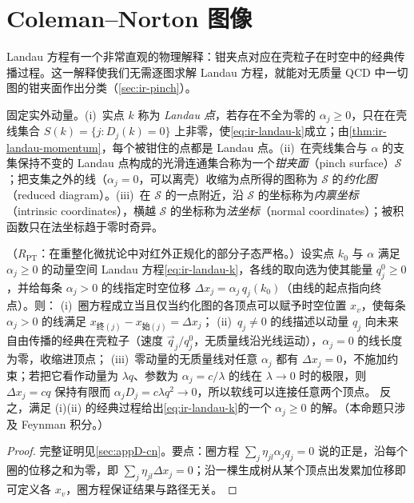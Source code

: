 \section{Coleman--Norton 图像}\label{sec:ir-coleman-norton}

Landau 方程有一个非常直观的物理解释：钳夹点对应在壳粒子在时空中的经典传播过程。这一解释使我们无需逐图求解 Landau 方程，就能对无质量 QCD 中一切图的钳夹面作出分类（\cref{sec:ir-pinch}）。

\begin{definition}\label{def:ir-pinch-surface}
固定实外动量。(i)~实点 $k$ 称为 \emph{Landau 点}，若存在不全为零的 $\alpha_j\ge0$，只在在壳线集合 $S(k)=\{j:D_j(k)=0\}$ 上非零，使\cref{eq:ir-landau-k}成立；由\cref{thm:ir-landau-momentum}，每个被钳住的点都是 Landau 点。(ii)~在壳线集合与 $\alpha$ 的支集保持不变的 Landau 点构成的光滑连通集合称为一个\emph{钳夹面}（pinch surface）$\mathcal S$；把支集之外的线（$\alpha_j=0$，可以离壳）收缩为点所得的图称为 $\mathcal S$ 的\emph{约化图}（reduced diagram）。(iii)~在 $\mathcal S$ 的一点附近，沿 $\mathcal S$ 的坐标称为\emph{内禀坐标}（intrinsic coordinates），横越 $\mathcal S$ 的坐标称为\emph{法坐标}（normal coordinates）；被积函数只在法坐标趋于零时奇异。
\end{definition}

\begin{proposition}\label{prop:ir-coleman-norton}
（$R_{\mathrm{PT}}$：在重整化微扰论中对红外正规化的部分子态严格。）设实点 $k_0$ 与 $\alpha$ 满足 $\alpha_j\ge0$ 的动量空间 Landau 方程\cref{eq:ir-landau-k}，各线的取向选为使其能量 $q_j^0\ge0$，并给每条 $\alpha_j>0$ 的线指定时空位移 $\Delta x_j=\alpha_j\,q_j(k_0)$（由线的起点指向终点）。则：
(i)~圈方程成立当且仅当约化图的各顶点可以赋予时空位置 $x_v$，使每条 $\alpha_j>0$ 的线满足 $x_{\text{终}(j)}-x_{\text{始}(j)}=\Delta x_j$；
(ii)~$q_j\ne0$ 的线描述以动量 $q_j$ 向未来自由传播的经典在壳粒子（速度 $\vec q_j/q_j^0$，无质量线沿光线运动），$\alpha_j=0$ 的线长度为零，收缩进顶点；
(iii)~零动量的无质量线对任意 $\alpha_j$ 都有 $\Delta x_j=0$，不施加约束；若把它看作动量为 $\lambda q$、参数为 $\alpha_j=c/\lambda$ 的线在 $\lambda\to0$ 时的极限，则 $\Delta x_j=cq$ 保持有限而 $\alpha_jD_j=c\lambda q^2\to0$，所以软线可以连接任意两个顶点。
反之，满足 (i)(ii) 的经典过程给出\cref{eq:ir-landau-k}的一个 $\alpha_j\ge0$ 的解。（本命题只涉及 Feynman 积分。）
\end{proposition}
\begin{proof}
完整证明见\cref{sec:appD-cn}。要点：圈方程 $\sum_j\eta_{jl}\alpha_jq_j=0$ 说的正是，沿每个圈的位移之和为零，即 $\sum_j\eta_{jl}\Delta x_j=0$；沿一棵生成树从某个顶点出发累加位移即可定义各 $x_v$，圈方程保证结果与路径无关。
\end{proof}

